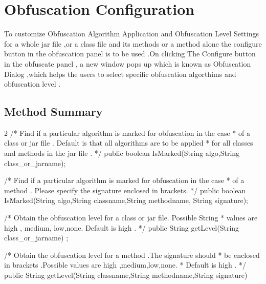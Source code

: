 \section{Obfuscation Configuration}
 To customize Obfuscation Algorithm Application
and Obfuscation Level Settings for a whole jar file ,or a class file and its methods  or a method alone
the configure button in the obfuscation panel is to be used .On clicking The Configure
button in the obfuscate panel , a new window pops up which is known
   as Obfuscation Dialog ,which helps the users to select specific obfuscation algorthims and
   obfuscation level .
\subsection {Method Summary}
\begin {listing}{2}
/*  Find if a particular algorithm is marked for obfuscation in the case
 *  of a class or jar file . Default is that all algorithms are to be applied
 *  for all classes and methods in the jar file .
 */
    public boolean IsMarked(String algo,String class_or_jarname);

/*  Find if a particular algorithm is marked for obfuscation in the case
 *  of a method . Please specify the  signature enclosed in brackets.
 */
    public boolean IsMarked(String algo,String classname,String methodname,
         String signature);

/*  Obtain the obfuscation level for a class or jar file. Possible String
 *  values are high , medium, low,none. Default is high .
 */
    public String getLevel(String class_or_jarname) ;

/*  Obtain the obfuscation  level for a method .The  signature should
 *   be enclosed in brackets .Possible values are high ,medium,low,none.
 *   Default is high .
 */
    public String getLevel(String classname,String methodname,String signature)
\end {listing}







